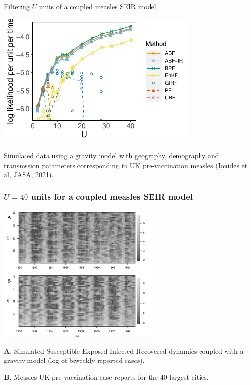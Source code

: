 \documentclass{beamer}
\begin{document}
\begin{frame}{Filtering $U$ units of a coupled measles SEIR model}

\vspace{-1mm}

\begin{center}
\includegraphics[width=10cm]{mscale_loglik_plot-1.pdf}


\end{center}

\vspace{-4mm}

Simulated data using a gravity model with geography, demography and transmssion parameters corresponding to UK pre-vaccination measles (Ionides et al, {JASA}, 2021).


\end{frame}

\begin{frame}
\frametitle{$U=40$ units for a coupled measles SEIR model}

\vspace{-2.7mm}

\begin{center}
\includegraphics[width=8cm]{slice_image_plot-1.pdf}
\end{center}

\vspace{-3mm}

{\bf A}. Simulated Susceptible-Exposed-Infected-Recovered dynamics coupled with a gravity model (log of biweekly reported cases).

{\bf B}. Measles UK pre-vaccination case reports for the 40 largest cities.





\end{frame}
\end{document}
